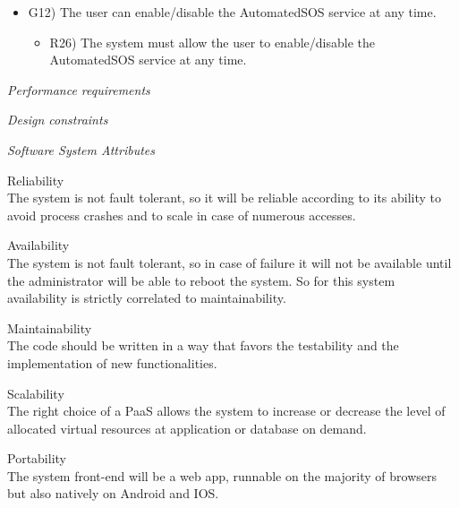 \documentclass{article}
\begin{document}
\begin{legal}
\begin{legal}
\begin{legal}
\begin{itemize}
{\begin{itemize}
					\end{itemize}
				}
				\item G12) The user can enable/disable the AutomatedSOS service at any time.\\
				{\normalfont
					\begin{itemize}
					\item R26) The system must allow the user to enable/disable the AutomatedSOS service at any time.\\
					\end{itemize}
				}
				\end{itemize}
			\end{legal}
    		
		\item \textit{Performance requirements}\\
		\item \textit{Design constraints}\\
    		\item \textit{Software System Attributes }\\
		\begin{legal}\bfseries
			\item Reliability\\
			{\normalfont The system is not fault tolerant, so it will be reliable according to its ability to avoid process crashes and to scale in case of numerous accesses.}
			\\
			\item Availability\\
			{\normalfont The system is not fault tolerant, so in case of failure it will not be available until the administrator will be able to reboot the system. So for this system availability is strictly correlated to maintainability.}
			\\
			\item Maintainability\\
			{\normalfont The code should be written in a way that favors the testability and the implementation of new functionalities.}
			\\
			\item Scalability\\
			{\normalfont The right choice of a PaaS allows the system to increase or decrease the level of allocated virtual resources at application or database on demand.}
			\\
			\item Portability\\
			{\normalfont The system front-end will be a web app, runnable on the majority of browsers but also natively on Android and IOS.}

\end{legal}
\end{legal}
\end{legal}
\end{document}
